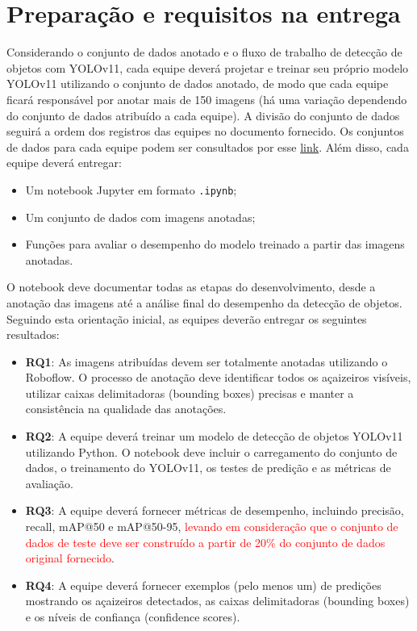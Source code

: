 \documentclass[a4paper,12pt]{article}
\begin{document}
\section{Preparação e requisitos na entrega}
Considerando o conjunto de dados anotado e o fluxo de trabalho de detecção de objetos com YOLOv11, cada equipe deverá projetar e treinar seu próprio modelo YOLOv11 utilizando o conjunto de dados anotado, de modo que cada equipe ficará responsável por anotar mais de 150 imagens (há uma variação dependendo do conjunto de dados atribuído a cada equipe). A divisão do conjunto de dados seguirá a ordem dos registros das equipes no documento fornecido. Os conjuntos de dados para cada equipe podem ser consultados por esse \href{https://nextcloud.lasseufpa.org/s/xdHLM7wJiBi65Bt?path=%2F}{link}. Além disso, cada equipe deverá entregar: 
\begin{itemize}
\item Um notebook Jupyter em formato \texttt{.ipynb};
\item Um conjunto de dados com imagens anotadas;
    \item Funções para avaliar o desempenho do modelo treinado a partir das imagens anotadas.
\end{itemize}

O notebook deve documentar todas as etapas do desenvolvimento, desde a anotação das imagens até a análise final do desempenho da detecção de objetos. Seguindo esta orientação inicial, as equipes deverão entregar os seguintes resultados:
\begin{itemize}
    \item \textbf{RQ1}: As imagens atribuídas devem ser totalmente anotadas utilizando o Roboflow. O processo de anotação deve identificar todos os açaizeiros visíveis, utilizar caixas delimitadoras (bounding boxes) precisas e manter a consistência na qualidade das anotações.
    \item \textbf{RQ2}: A equipe deverá treinar um modelo de detecção de objetos YOLOv11 utilizando Python. O notebook deve incluir o carregamento do conjunto de dados, o treinamento do YOLOv11, os testes de predição e as métricas de avaliação.
    \item \textbf{RQ3}: A equipe deverá fornecer métricas de desempenho, incluindo precisão, recall, mAP@50 e mAP@50-95, \textcolor{red}{levando em consideração que o conjunto de dados de teste deve ser construído a partir de 20\% do conjunto de dados original fornecido}.
    \item \textbf{RQ4}: A equipe deverá fornecer exemplos (pelo menos um) de predições mostrando os açaizeiros detectados, as caixas delimitadoras (bounding boxes) e os níveis de confiança (confidence scores).
\end{itemize}
\end{document}
